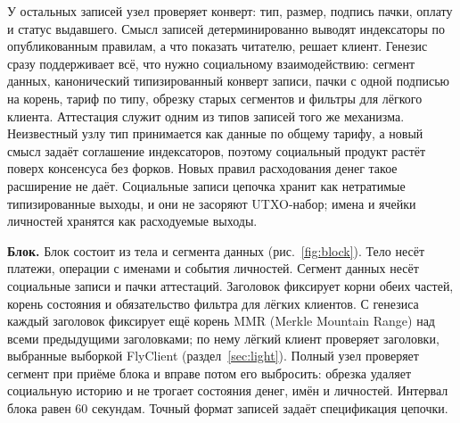 \documentclass[10pt,a4paper]{article}
\begin{document}
У остальных записей узел проверяет конверт: тип, размер, подпись пачки, оплату и статус выдавшего.
Смысл записей детерминированно выводят индексаторы по опубликованным правилам, а что показать читателю, решает клиент.
Генезис сразу поддерживает всё, что нужно социальному взаимодействию: сегмент данных, канонический типизированный конверт записи, пачки с одной подписью на корень, тариф по типу, обрезку старых сегментов и фильтры для лёгкого клиента.
Аттестация служит одним из типов записей того же механизма.
Неизвестный узлу тип принимается как данные по общему тарифу, а новый смысл задаёт соглашение индексаторов, поэтому социальный продукт растёт поверх консенсуса без форков.
Новых правил расходования денег такое расширение не даёт.
Социальные записи цепочка хранит как нетратимые типизированные выходы, и они не засоряют UTXO-набор; имена и ячейки личностей хранятся как расходуемые выходы.

\textbf{Блок.}
Блок состоит из тела и сегмента данных (рис.~\ref{fig:block}).
Тело несёт платежи, операции с именами и события личностей.
Сегмент данных несёт социальные записи и пачки аттестаций.
Заголовок фиксирует корни обеих частей, корень состояния и обязательство фильтра для лёгких клиентов.
С генезиса каждый заголовок фиксирует ещё корень MMR (Merkle Mountain Range) над всеми предыдущими заголовками; по нему лёгкий клиент проверяет заголовки, выбранные выборкой FlyClient (раздел~\ref{sec:light}).
Полный узел проверяет сегмент при приёме блока и вправе потом его выбросить: обрезка удаляет социальную историю и не трогает состояния денег, имён и личностей.
Интервал блока равен 60 секундам.
Точный формат записей задаёт спецификация цепочки.
\end{document}
